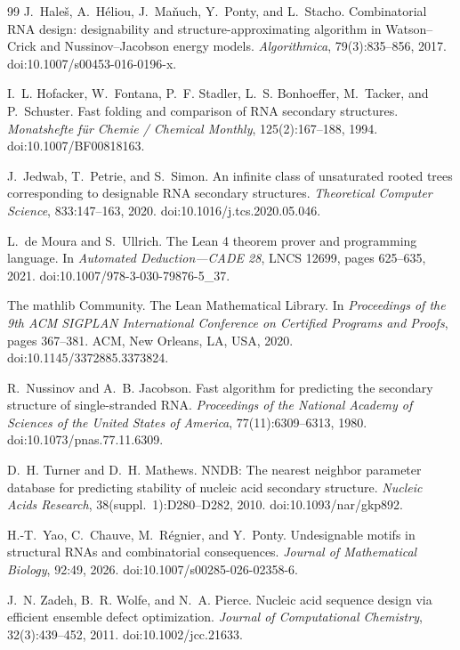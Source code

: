 \documentclass[11pt]{article}
\begin{document}
\begin{thebibliography}{99}
J.~Hale\v{s}, A.~H\'eliou, J.~Ma\v{n}uch, Y.~Ponty, and L.~Stacho.
\newblock Combinatorial RNA design: designability and structure-approximating
  algorithm in Watson--Crick and Nussinov--Jacobson energy models.
\newblock \emph{Algorithmica}, 79(3):835--856, 2017.
\newblock doi:10.1007/s00453-016-0196-x.

I.~L. Hofacker, W.~Fontana, P.~F. Stadler, L.~S. Bonhoeffer, M.~Tacker,
  and P.~Schuster.
\newblock Fast folding and comparison of RNA secondary structures.
\newblock \emph{Monatshefte f\"ur Chemie / Chemical Monthly},
  125(2):167--188, 1994.
\newblock doi:10.1007/BF00818163.

J.~Jedwab, T.~Petrie, and S.~Simon.
\newblock An infinite class of unsaturated rooted trees corresponding to
  designable RNA secondary structures.
\newblock \emph{Theoretical Computer Science}, 833:147--163, 2020.
\newblock doi:10.1016/j.tcs.2020.05.046.

L.~de Moura and S.~Ullrich.
\newblock The Lean 4 theorem prover and programming language.
\newblock In \emph{Automated Deduction---CADE 28}, LNCS 12699, pages 625--635,
  2021.
\newblock doi:10.1007/978-3-030-79876-5\_37.

The mathlib Community.
\newblock The Lean Mathematical Library.
\newblock In \emph{Proceedings of the 9th ACM SIGPLAN International Conference on Certified Programs and Proofs}, pages 367--381. ACM, New Orleans, LA, USA, 2020.
\newblock doi:10.1145/3372885.3373824.

R.~Nussinov and A.~B. Jacobson.
\newblock Fast algorithm for predicting the secondary structure of
  single-stranded RNA.
\newblock \emph{Proceedings of the National Academy of Sciences of the
  United States of America}, 77(11):6309--6313, 1980.
\newblock doi:10.1073/pnas.77.11.6309.

D.~H. Turner and D.~H. Mathews.
\newblock NNDB: The nearest neighbor parameter database for predicting
  stability of nucleic acid secondary structure.
\newblock \emph{Nucleic Acids Research}, 38(suppl.~1):D280--D282, 2010.
\newblock doi:10.1093/nar/gkp892.

H.-T.~Yao, C.~Chauve, M.~R\'egnier, and Y.~Ponty.
\newblock Undesignable motifs in structural RNAs and combinatorial
  consequences.
\newblock \emph{Journal of Mathematical Biology}, 92:49, 2026.
\newblock doi:10.1007/s00285-026-02358-6.

J.~N. Zadeh, B.~R. Wolfe, and N.~A. Pierce.
\newblock Nucleic acid sequence design via efficient ensemble defect optimization.
\newblock \emph{Journal of Computational Chemistry}, 32(3):439--452, 2011.
\newblock doi:10.1002/jcc.21633.

\end{thebibliography}
\normalsize
\end{document}
